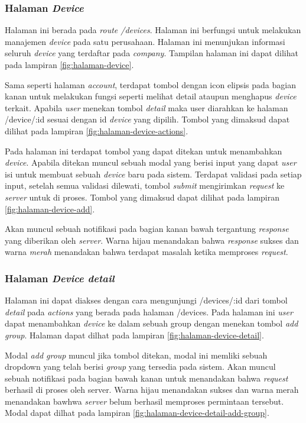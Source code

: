 \subsubsection{Halaman \textit{Device}}
Halaman ini berada pada \textit{route /devices}. Halaman ini berfungsi untuk melakukan manajemen \textit{device} pada satu perusahaan. Halaman ini menunjukan informasi seluruh \textit{device} yang terdaftar pada \textit{company}. Tampilan halaman ini dapat dilihat pada lampiran \ref{fig:halaman-device}.

Sama seperti halaman \textit{account}, terdapat tombol dengan icon elipsis pada bagian kanan untuk melakukan fungsi seperti melihat detail ataupun menghapus \textit{device} terkait. Apabila \textit{user} menekan tombol \textit{detail} maka user diarahkan ke halaman /device/:id sesuai dengan id \textit{device} yang dipilih. Tombol yang dimaksud dapat dilihat pada lampiran \ref{fig:halaman-device-actions}.

Pada halaman ini terdapat tombol yang dapat ditekan untuk menambahkan \textit{device}. Apabila ditekan muncul sebuah modal yang berisi input yang dapat \textit{user} isi untuk membuat sebuah \textit{device} baru pada sistem. Terdapat validasi pada setiap input, setelah semua validasi dilewati, tombol \textit{submit} mengirimkan \textit{request} ke \textit{server} untuk di proses. Tombol yang dimaksud dapat dilihat pada lampiran \ref{fig:halaman-device-add}.

Akan muncul sebuah notifikasi pada bagian kanan bawah tergantung \textit{response} yang diberikan oleh \textit{server}. Warna hijau menandakan bahwa \textit{response} sukses dan warna \textit{merah} menandakan bahwa terdapat masalah ketika memproses \textit{request}.

\subsubsection{Halaman \textit{Device detail}}
Halaman ini dapat diakses dengan cara mengunjungi /devices/:id dari tombol \textit{detail} pada \textit{actions} yang berada pada halaman /devices. Pada halaman ini \textit{user} dapat menambahkan \textit{device} ke dalam sebuah group dengan menekan tombol \textit{add group}. Halaman dapat dilhat pada lampiran \ref{fig:halaman-device-detail}.

Modal \textit{add group} muncul jika tombol ditekan, modal ini memliki sebuah dropdown yang telah berisi \textit{group} yang tersedia pada sistem. Akan muncul sebuah notifikasi pada bagian bawah kanan untuk menandakan bahwa \textit{request} berhasil di proses oleh server. Warna hijau menandakan sukses dan warna merah menandakan bawhwa \textit{server} belum berhasil memproses permintaan tersebut. Modal dapat dilhat pada lampiran \ref{fig:halaman-device-detail-add-group}.

